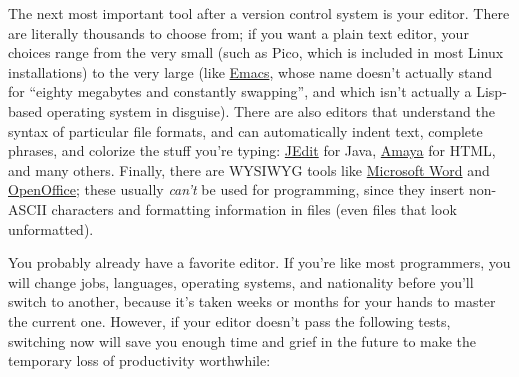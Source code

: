 \documentclass{report}
\begin{document}

The next most important tool after a version control system is your
editor.  There are literally thousands to choose from; if you want a
plain text editor, your choices range from the very small (such as
Pico, which is included in most Linux installations) to the very large
(like \url{Emacs}, whose name doesn't actually stand for ``eighty
megabytes and constantly swapping'', and which isn't actually a
Lisp-based operating system in disguise).  There are also editors that
understand the syntax of particular file formats, and can
automatically indent text, complete phrases, and colorize the stuff
you're typing: \url{JEdit} for Java, \url{Amaya} for HTML, and many
others.  Finally, there are WYSIWYG tools like \url{Microsoft Word}
and \url{OpenOffice}; these usually \emph{can't} be used for
programming, since they insert non-ASCII characters and formatting
information in files (even files that look unformatted).

You probably already have a favorite editor.  If you're like most
programmers, you will change jobs, languages, operating systems, and
nationality before you'll switch to another, because it's taken weeks
or months for your hands to master the current one.  However, if your
editor doesn't pass the following tests, switching now will save you
enough time and grief in the future to make the temporary loss of
productivity worthwhile:
\end{document}
